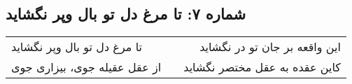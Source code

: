 \begin{center}
\section*{شماره ۷: تا مرغ دل تو بال وپر نگشاید}
\label{sec:007}
\begin{longtable}{l p{0.5cm} r}
تا مرغ دل تو بال وپر نگشاید
&&
این واقعه بر جان تو در نگشاید
\\
از عقل عقیله جوی، بیزاری جوی
&&
کاین عقده به عقل مختصر نگشاید
\\
\end{longtable}
\end{center}
